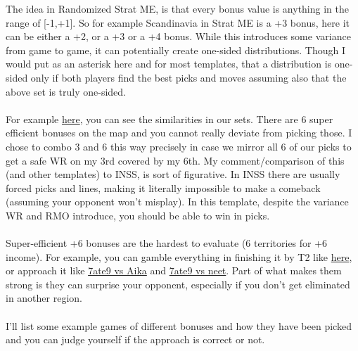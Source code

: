 The idea in Randomized Strat ME, is that every bonus value is anything in the range of [-1,+1]. So for example Scandinavia in Strat ME is a +3 bonus, here it can be either a +2, or a +3 or a +4 bonus. While this introduces some variance from game to game, it can potentially create one-sided distributions. Though I would put as an asterisk here and for most templates, that a distribution is one-sided only if both players find the best picks and moves assuming also that the above set is truly one-sided. 
\\
\\For example \href{https://www.warzone.com/MultiPlayer?GameID=41209813}{here}, you can see the similarities in our sets. There are 6 super efficient bonuses on the map and you cannot really deviate from picking those. I chose to combo 3 and 6 this way precisely in case we mirror all 6 of our picks to get a safe WR on my 3rd covered by my 6th. My comment/comparison of this (and other templates) to INSS, is sort of figurative. In INSS there are usually forced picks and lines, making it literally impossible to make a comeback (assuming your opponent won't misplay). In this template, despite the variance WR and RMO introduce, you should be able to win in picks.
\\
\\
Super-efficient +6 bonuses are the hardest to evaluate (6 territories for +6 income). For example, you can gamble everything in finishing it by T2 like \href{https://www.warzone.com/MultiPlayer?GameID=41386005}{here}, or approach it like \href{https://www.warzone.com/MultiPlayer?GameID=41513105}{7ate9 vs Aika} and \href{https://www.warzone.com/MultiPlayer?GameID=41137719}{7ate9 vs neet}. Part of what makes them strong is they can surprise your opponent, especially if you don't get eliminated in another region.
\\
\\
I'll list some example games of different bonuses and how they have been picked and you can judge yourself if the approach is correct or not.
